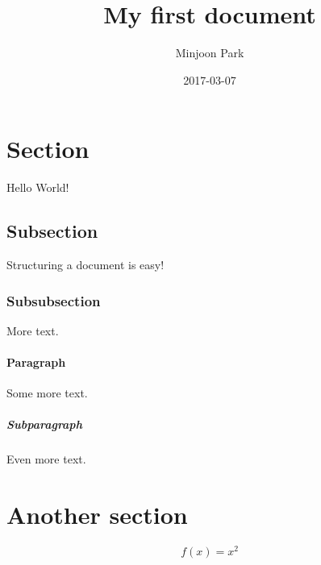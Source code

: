 \documentclass{article}
\title{My first document}
\date{2017-03-07}
\author{Minjoon Park}
\begin{document}
  \maketitle
  \newpage

\section{Section}

Hello World!

\subsection{Subsection}

Structuring a document is easy!

\subsubsection{Subsubsection}

More text.

\paragraph{Paragraph}

Some more text.

\subparagraph{Subparagraph}

Even more text.

\section{Another section}

\begin{equation}
  f(x) = x^2
\end{equation}
\end{document}
